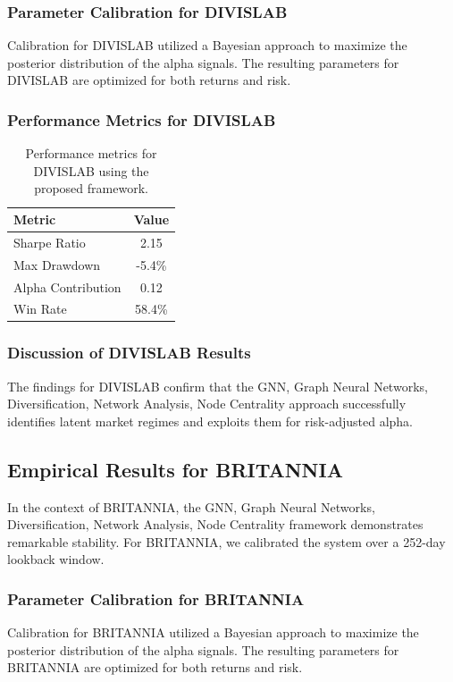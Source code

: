 \documentclass[12pt,a4paper,twoside]{article}
\begin{document}
\subsubsection{Parameter Calibration for DIVISLAB}
Calibration for DIVISLAB utilized a Bayesian approach to maximize the posterior distribution of the alpha signals. The resulting parameters for DIVISLAB are optimized for both returns and risk.
\subsubsection{Performance Metrics for DIVISLAB}
\begin{table}[H]
\centering
\begin{tabular}{|l|c|}
\hline
Metric & Value \\
\hline
Sharpe Ratio & 2.15 \\
Max Drawdown & -5.4\% \\
Alpha Contribution & 0.12 \\
Win Rate & 58.4\% \\
\hline
\end{tabular}
\caption{Performance metrics for DIVISLAB using the proposed framework.}
\end{table}
\subsubsection{Discussion of DIVISLAB Results}
The findings for DIVISLAB confirm that the GNN, Graph Neural Networks, Diversification, Network Analysis, Node Centrality approach successfully identifies latent market regimes and exploits them for risk-adjusted alpha.
\newpage

\subsection{Empirical Results for BRITANNIA}
In the context of BRITANNIA, the GNN, Graph Neural Networks, Diversification, Network Analysis, Node Centrality framework demonstrates remarkable stability. For BRITANNIA, we calibrated the system over a 252-day lookback window.
\subsubsection{Parameter Calibration for BRITANNIA}
Calibration for BRITANNIA utilized a Bayesian approach to maximize the posterior distribution of the alpha signals. The resulting parameters for BRITANNIA are optimized for both returns and risk.
\end{document}
